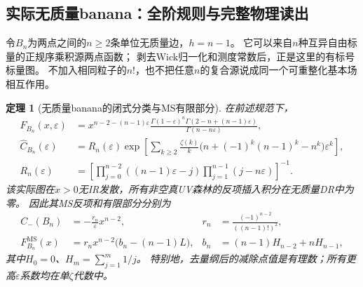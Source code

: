 \documentclass[11pt,a4paper]{ctexart}
\theoremstyle{cnplain}\newtheorem{theorem}{定理}[section]
\theoremstyle{definition}\newtheorem{definition}[theorem]{定义}
\theoremstyle{remark}\newtheorem{remark}[theorem]{注}
\begin{document}
\subsection{实际无质量banana：全阶规则与完整物理读出}
令$B_n$为两点之间的$n\ge2$条单位无质量边，$h=n-1$。
它可以来自$n$种互异自由标量的正规序乘积源两点函数；
剥去Wick归一化和测度常数后，正是这里的有标号标量图。
不加入相同粒子的$n!$，也不把任意$n$的复合源说成同一个可重整化基本场相互作用。

\begin{theorem}[无质量banana的闭式分类与MS有限部分]\label{thm:masslessbanana}
在前述规范下，
\begin{align}
 F_{B_n}(x,\varepsilon)
 &=x^{n-2-(n-1)\varepsilon}
 \frac{\Gamma(1-\varepsilon)^n
       \Gamma(2-n+(n-1)\varepsilon)}{\Gamma(n-n\varepsilon)},
 \label{eq:masslessbananaexact}\\
 \widehat C_{B_n}(\varepsilon)
 &=R_n(\varepsilon)\exp\left[
 \sum_{k\ge2}\frac{\zeta(k)}k
 \bigl(n+(-1)^k(n-1)^k-n^k\bigr)\varepsilon^k\right],\\
 R_n(\varepsilon)&=
 \left[\prod_{j=0}^{n-2}((n-1)\varepsilon-j)
       \prod_{j=1}^{n-1}(j-n\varepsilon)\right]^{-1}.
\end{align}
该实际图在$x>0$无IR发散，所有非空真UV森林的反项插入积分在无质量DR中为零。
因此其MS反项和有限部分分别为
\begin{align}
 C_-(B_n)&=-\frac{r_n}{\varepsilon}x^{n-2},
 &r_n&=\frac{(-1)^{n-2}}{((n-1)!)^2},\\
 F^{\mathrm{MS}}_{B_n}(x)&=r_nx^{n-2}\bigl(b_n-(n-1)L\bigr),
 &b_n&=(n-1)H_{n-2}+nH_{n-1},\label{eq:masslessbananaMS}
\end{align}
其中$H_0=0$、$H_m=\sum_{j=1}^m1/j$。
特别地，去量纲后的减除点值是有理数；所有更高$\varepsilon$系数均在单$\zeta$代数中。
\end{theorem}
\end{document}
